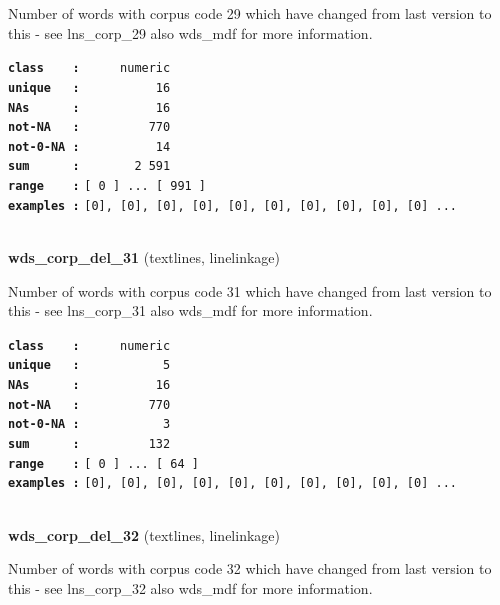 \documentclass[]{article}
\begin{document}
Number of words with corpus code 29 which have changed from last version
to this - see lns\_corp\_29 also wds\_mdf for more information.

\textbf{\texttt{class\ \ \ \ :}} \texttt{~~~~~numeric}\\
\textbf{\texttt{unique\ \ \ :}} \texttt{~~~~~~~~~~16}\\
\textbf{\texttt{NAs\ \ \ \ \ \ :}} \texttt{~~~~~~~~~~16}\\
\textbf{\texttt{not-NA\ \ \ :}} \texttt{~~~~~~~~~770}\\
\textbf{\texttt{not-0-NA\ :}} \texttt{~~~~~~~~~~14}\\
\textbf{\texttt{sum\ \ \ \ \ \ :}} \texttt{~~~~~~~2~591}\\
\textbf{\texttt{range\ \ \ \ :}}
\texttt{{[}\ 0\ {]}\ ...\ {[}\ 991\ {]}}\\
\textbf{\texttt{examples\ :}}
\texttt{{[}0{]},\ {[}0{]},\ {[}0{]},\ {[}0{]},\ {[}0{]},\ {[}0{]},\ {[}0{]},\ {[}0{]},\ {[}0{]},\ {[}0{]}\ ...}\\

~

\textbf{wds\_corp\_del\_31} (textlines, linelinkage)

Number of words with corpus code 31 which have changed from last version
to this - see lns\_corp\_31 also wds\_mdf for more information.

\textbf{\texttt{class\ \ \ \ :}} \texttt{~~~~~numeric}\\
\textbf{\texttt{unique\ \ \ :}} \texttt{~~~~~~~~~~~5}\\
\textbf{\texttt{NAs\ \ \ \ \ \ :}} \texttt{~~~~~~~~~~16}\\
\textbf{\texttt{not-NA\ \ \ :}} \texttt{~~~~~~~~~770}\\
\textbf{\texttt{not-0-NA\ :}} \texttt{~~~~~~~~~~~3}\\
\textbf{\texttt{sum\ \ \ \ \ \ :}} \texttt{~~~~~~~~~132}\\
\textbf{\texttt{range\ \ \ \ :}}
\texttt{{[}\ 0\ {]}\ ...\ {[}\ 64\ {]}}\\
\textbf{\texttt{examples\ :}}
\texttt{{[}0{]},\ {[}0{]},\ {[}0{]},\ {[}0{]},\ {[}0{]},\ {[}0{]},\ {[}0{]},\ {[}0{]},\ {[}0{]},\ {[}0{]}\ ...}\\

~

\textbf{wds\_corp\_del\_32} (textlines, linelinkage)

Number of words with corpus code 32 which have changed from last version
to this - see lns\_corp\_32 also wds\_mdf for more information.
\end{document}
